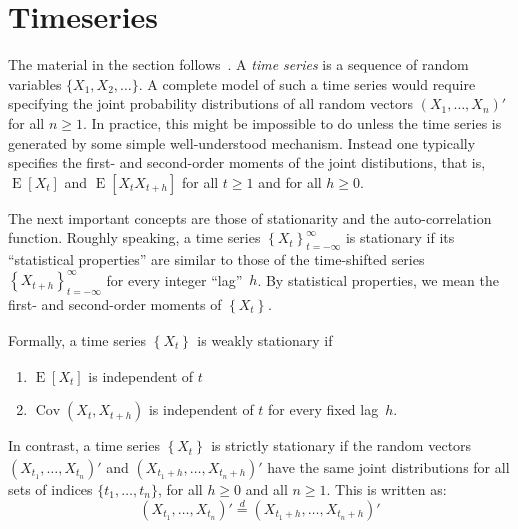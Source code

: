 \documentclass[11pt,a4]{article}
\DeclareMathOperator{\cov}{Cov}
\DeclareMathOperator{\E}{E}
\newcommand{\ts}[3]{\ensuremath{\left \{ #1 \right \}_{#2}^{#3}}}
\newcommand{\eqd}{\ensuremath{\stackrel{d}{=}}}
\theoremstyle{definition}
\begin{document}
\section{Timeseries}

The material in the section follows~\cite{BroDav}. A \emph{time series} is a
sequence of random variables $\{X_1, X_2, \ldots \}$. A complete model of such
a time series would require specifying the joint probability distributions of
all random vectors $(X_1, \ldots, X_n)'$ for all $n \geq 1$. In practice, this
might be impossible to do unless the time series is generated by some simple
well-understood mechanism. Instead one typically specifies the first- and
second-order moments of the joint distibutions, that is, $\E[X_t]$ and $\E[X_t
X_{t + h}]$ for all $t \geq 1$ and for all $h \geq 0$. 

The next important concepts are those of stationarity and the auto-correlation
function. Roughly speaking, a time series $\ts{X_t}{t = -\infty}{\infty}$ is
stationary if its ``statistical properties'' are similar to those of the
time-shifted series $\ts{X_{t + h}}{t = -\infty}{\infty}$ for every integer
``lag''~$h$. By statistical properties, we mean the first- and second-order
moments of $\ts{X_t}{}{}$. 

Formally, a time series $\ts{X_t}{}{}$ is weakly stationary if 
\begin{enumerate}
	\item $\E[X_t]$ is independent of $t$
	\item $\cov(X_t, X_{t + h})$ is independent of $t$ for every fixed lag~$h$.
\end{enumerate} 
In contrast, a time series $\ts{X_t}{}{}$ is strictly stationary if the random
vectors $(X_{t_1}, \ldots, X_{t_n})'$ and $(X_{t_1 + h}, \ldots, X_{t_n + h})'$
have the same joint distributions for all sets of indices $\{t_1, \ldots,
t_n\}$, for all $h \geq 0$ and all $n \geq 1$. This is written as:
\[
(X_{t_1}, \ldots, X_{t_n})' \eqd (X_{t_1 + h}, \ldots, X_{t_n + h})'
\] 
\end{document}

